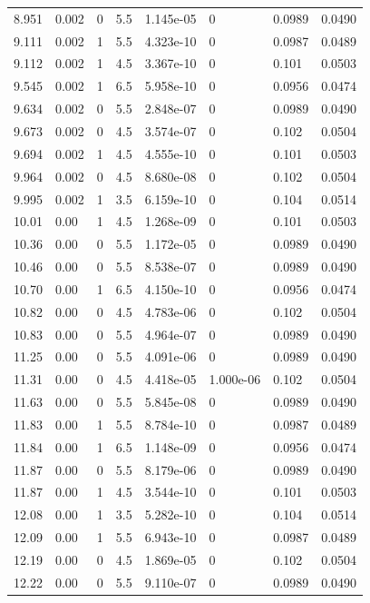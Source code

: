 \documentclass[preview]{standalone}
\begin{document}
{{{\begin{tabular}{L{1.2cm}C{1.2cm} C{0.3cm}C{0.5cm} C{1.4cm}C{1.4cm} C{1.4cm}C{1.4cm}}
  8.951  &  0.002  & 0     & 5.5 &  1.145e-05  & 0  & 0.0989 &  0.0490   \\ 
  9.111  &  0.002  & 1     & 5.5 &  4.323e-10  & 0  & 0.0987 &  0.0489   \\ 
  9.112  &  0.002  & 1     & 4.5 &  3.367e-10  & 0  & 0.101 &  0.0503   \\ 
  9.545  &  0.002  & 1     & 6.5 &  5.958e-10  & 0  & 0.0956 &  0.0474   \\ 
  9.634  &  0.002  & 0     & 5.5 &  2.848e-07  & 0  & 0.0989 &  0.0490   \\ 
  9.673  &  0.002  & 0     & 4.5 &  3.574e-07  & 0  & 0.102 &  0.0504   \\ 
  9.694  &  0.002  & 1     & 4.5 &  4.555e-10  & 0  & 0.101 &  0.0503   \\ 
  9.964  &  0.002  & 0     & 4.5 &  8.680e-08  & 0  & 0.102 &  0.0504   \\ 
  9.995  &  0.002  & 1     & 3.5 &  6.159e-10  & 0  & 0.104 &  0.0514   \\ 
  10.01  &  0.00  & 1     & 4.5 &  1.268e-09  & 0  & 0.101 &  0.0503   \\ 
  10.36  &  0.00  & 0     & 5.5 &  1.172e-05  & 0  & 0.0989 &  0.0490   \\ 
  10.46  &  0.00  & 0     & 5.5 &  8.538e-07  & 0  & 0.0989 &  0.0490   \\ 
  10.70  &  0.00  & 1     & 6.5 &  4.150e-10  & 0  & 0.0956 &  0.0474   \\ 
  10.82  &  0.00  & 0     & 4.5 &  4.783e-06  & 0  & 0.102 &  0.0504   \\ 
  10.83  &  0.00  & 0     & 5.5 &  4.964e-07  & 0  & 0.0989 &  0.0490   \\ 
  11.25  &  0.00  & 0     & 5.5 &  4.091e-06  & 0  & 0.0989 &  0.0490   \\ 
  11.31  &  0.00  & 0     & 4.5 &  4.418e-05  & 1.000e-06  & 0.102 &  0.0504   \\ 
  11.63  &  0.00  & 0     & 5.5 &  5.845e-08  & 0  & 0.0989 &  0.0490   \\ 
  11.83  &  0.00  & 1     & 5.5 &  8.784e-10  & 0  & 0.0987 &  0.0489   \\ 
  11.84  &  0.00  & 1     & 6.5 &  1.148e-09  & 0  & 0.0956 &  0.0474   \\ 
  11.87  &  0.00  & 0     & 5.5 &  8.179e-06  & 0  & 0.0989 &  0.0490   \\ 
  11.87  &  0.00  & 1     & 4.5 &  3.544e-10  & 0  & 0.101 &  0.0503   \\ 
  12.08  &  0.00  & 1     & 3.5 &  5.282e-10  & 0  & 0.104 &  0.0514   \\ 
  12.09  &  0.00  & 1     & 5.5 &  6.943e-10  & 0  & 0.0987 &  0.0489   \\ 
  12.19  &  0.00  & 0     & 4.5 &  1.869e-05  & 0  & 0.102 &  0.0504   \\ 
  12.22  &  0.00  & 0     & 5.5 &  9.110e-07  & 0  & 0.0989 &  0.0490   \\ 
\hline 
\end{tabular} 

}}}
\end{document}
